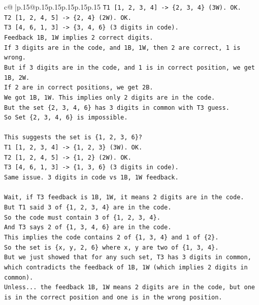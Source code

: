 \documentclass{article}
\begin{document}
{\begin{supertabular}{c@{$\;$}|p{.15\linewidth}@{}p{.15\linewidth}p{.15\linewidth}p{.15\linewidth}p{.15\linewidth}p{.15\linewidth}}
{{{\texttt{T1 {[}1, 2, 3, 4{]} {-}> \{2, 3, 4\} (3W). OK.} \\
\texttt{T2 {[}1, 2, 4, 5{]} {-}> \{2, 4\} (2W). OK.} \\
\texttt{T3 {[}4, 6, 1, 3{]} {-}> \{3, 4, 6\} (3 digits in code).} \\
\texttt{Feedback 1B, 1W implies 2 correct digits.} \\
\texttt{If 3 digits are in the code, and 1B, 1W, then 2 are correct, 1 is wrong.} \\
\texttt{But if 3 digits are in the code, and 1 is in correct position, we get 1B, 2W.} \\
\texttt{If 2 are in correct positions, we get 2B.} \\
\texttt{We got 1B, 1W. This implies only 2 digits are in the code.} \\
\texttt{But the set \{2, 3, 4, 6\} has 3 digits in common with T3 guess.} \\
\texttt{So Set \{2, 3, 4, 6\} is impossible.} \\
\\ 
\texttt{This suggests the set is \{1, 2, 3, 6\}?} \\
\texttt{T1 {[}1, 2, 3, 4{]} {-}> \{1, 2, 3\} (3W). OK.} \\
\texttt{T2 {[}1, 2, 4, 5{]} {-}> \{1, 2\} (2W). OK.} \\
\texttt{T3 {[}4, 6, 1, 3{]} {-}> \{1, 3, 6\} (3 digits in code).} \\
\texttt{Same issue. 3 digits in code vs 1B, 1W feedback.} \\
\\ 
\texttt{Wait, if T3 feedback is 1B, 1W, it means 2 digits are in the code.} \\
\texttt{But T1 said 3 of \{1, 2, 3, 4\} are in the code.} \\
\texttt{So the code must contain 3 of \{1, 2, 3, 4\}.} \\
\texttt{And T3 says 2 of \{1, 3, 4, 6\} are in the code.} \\
\texttt{This implies the code contains 2 of \{1, 3, 4\} and 1 of \{2\}.} \\
\texttt{So the set is \{x, y, 2, 6\} where x, y are two of \{1, 3, 4\}.} \\
\texttt{But we just showed that for any such set, T3 has 3 digits in common, which contradicts the feedback of 1B, 1W (which implies 2 digits in common).} \\
\texttt{Unless... the feedback 1B, 1W means 2 digits are in the code, but one is in the correct position and one is in the wrong position.} \\
}}}
\end{supertabular}}
\end{document}
